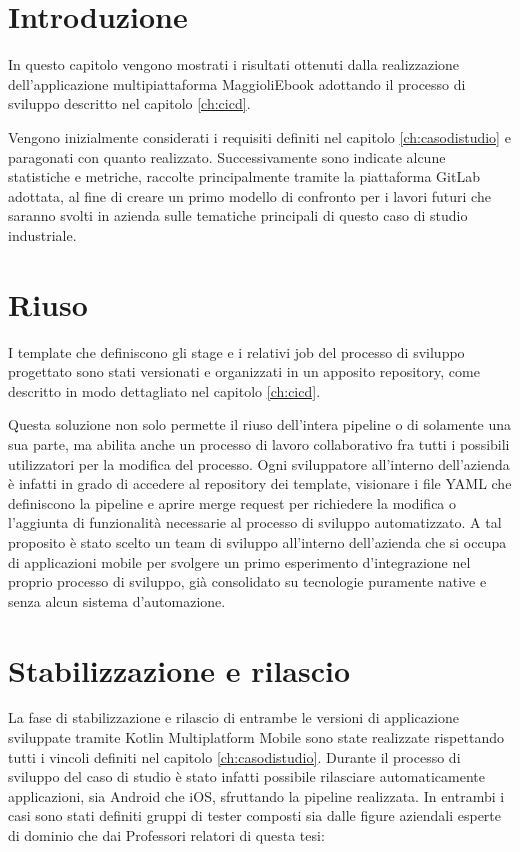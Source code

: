 
\section{Introduzione}
In questo capitolo vengono mostrati i risultati ottenuti dalla realizzazione dell'applicazione multipiattaforma MaggioliEbook adottando il processo di sviluppo descritto nel capitolo \ref{ch:cicd}.

Vengono inizialmente considerati i requisiti definiti nel capitolo \ref{ch:casodistudio} e paragonati con quanto realizzato.
Successivamente sono indicate alcune statistiche e metriche,
raccolte principalmente tramite la piattaforma GitLab adottata,
al fine di creare un primo modello di confronto per i lavori futuri che saranno svolti in azienda sulle tematiche principali di questo caso di studio industriale.

\section{Riuso}
I template che definiscono gli stage e i relativi job del processo di sviluppo progettato sono stati versionati e organizzati in un apposito repository, 
come descritto in modo dettagliato nel capitolo \ref{ch:cicd}.

Questa soluzione non solo permette il riuso dell'intera pipeline o di solamente una sua parte, 
ma abilita anche un processo di lavoro collaborativo fra tutti i possibili utilizzatori per la modifica del processo.
Ogni sviluppatore all'interno dell'azienda è infatti in grado di accedere al repository dei template, 
visionare i file YAML che definiscono la pipeline e aprire merge request per richiedere la modifica o l'aggiunta di funzionalità necessarie al processo di sviluppo automatizzato. 
A tal proposito è stato scelto un team di sviluppo all'interno dell'azienda che si occupa di applicazioni mobile per svolgere un primo esperimento d'integrazione nel proprio processo di sviluppo, 
già consolidato su tecnologie puramente native e senza alcun sistema d'automazione.

\section{Stabilizzazione e rilascio}
La fase di stabilizzazione e rilascio di entrambe le versioni di applicazione sviluppate tramite Kotlin Multiplatform Mobile sono state realizzate rispettando tutti i vincoli definiti nel capitolo \ref{ch:casodistudio}. 
Durante il processo di sviluppo del caso di studio è stato infatti possibile rilasciare automaticamente applicazioni, 
sia Android che iOS,
sfruttando la pipeline realizzata. 
In entrambi i casi sono stati definiti gruppi di tester composti sia dalle figure aziendali esperte di dominio che dai Professori relatori di questa tesi:

